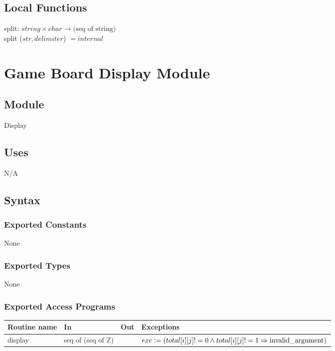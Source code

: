 \documentclass[12pt]{article}
\begin{document}
\subsection*{Local Functions}

\noindent split: $string \times char \rightarrow \mbox{(seq of string)}$\\
\noindent split ($str, delimiter$) $= internal$ \\



\newpage

\section* {Game Board Display Module}

\subsection*{Module}

Display

\subsection* {Uses}

N/A

\subsection* {Syntax}

\subsubsection* {Exported Constants}

None

\subsubsection* {Exported Types}

None

\subsubsection* {Exported Access Programs}

\begin{tabular}{| l | l | l | l |}
\hline
\textbf{Routine name} & \textbf{In} & \textbf{Out} & \textbf{Exceptions}\\
\hline
display & seq of (seq of $\mathbb{Z}$) & ~ & $exc := (total[i][j] != 0 \land total[i][j] != 1 \Rightarrow {\rm invalid\_argument})$\\
\hline
\end{tabular}
\end{document}
